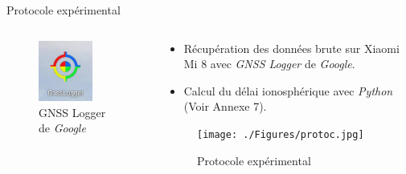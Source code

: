 \documentclass[xcolor=dvipsnames,envcountsect]{beamer}
\begin{document}
\begin{frame}{Protocole expérimental}
	 \begin{columns}
		\begin{column}{0.3\textwidth}
			\begin{figure}
				\centering
				\includegraphics[width=0.7\textwidth]{./Figures/gnss_logger.jpg}
				\caption {GNSS Logger de \textit{Google}}	
			\end{figure}
		\end{column}
		\begin{column}{0.7\textwidth}
			\begin{itemize}
				\item Récupération des données brute sur Xiaomi Mi 8 avec \textit{GNSS Logger} de \textit{Google}.
				\item Calcul du délai ionosphérique avec \textit{Python} {\tiny (Voir Annexe 7)}.
			\end{itemize}
			\begin{figure}
				\centering
				\texttt{[image: ./Figures/protoc.jpg]}
				\caption {Protocole expérimental}
			\end{figure}
		\end{column}
	 \end{columns}
\end{frame}
\end{document}
